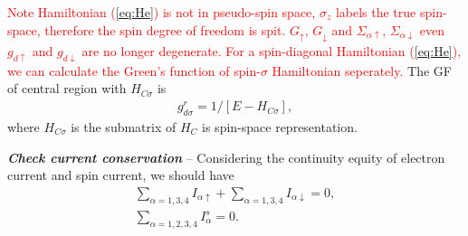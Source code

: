 \documentclass[aps,prb,superscriptaddress]{revtex4-2}
\begin{document}
\textcolor{red}{Note Hamiltonian (\ref{eq:He}) is not in pseudo-spin space, $\sigma_z$ labels the true spin-space, therefore the spin degree of freedom is spit. $G_{\uparrow}$, $G_{\downarrow}$ and $\Sigma_{\alpha\uparrow}$, $\Sigma_{\alpha\downarrow}$ even $g_{d\uparrow}$ and $g_{d\downarrow}$ are no longer degenerate. For a spin-diagonal Hamiltonian (\ref{eq:He}), we can calculate the Green's function of spin-$\sigma$ Hamiltonian seperately.} The GF of central region with $H_{C\sigma}$ is
\begin{eqnarray}
g_{d\sigma}^r = 1/[E-H_{C\sigma}],
\end{eqnarray}
where $H_{C\sigma}$ is the submatrix of $H_{C}$ is spin-space representation. %

{\noindent \textbf{\textit{Check current conservation}}} -- Considering the continuity equity of electron current and spin current, we should have
\begin{gather}
\sum_{\alpha=1,3,4}I_{\alpha\uparrow} + \sum_{\alpha=1,3,4}I_{\alpha\downarrow} = 0,\\
\sum_{\alpha=1,2,3,4}I_{\alpha}^s = 0.
\end{gather}
\end{document}
